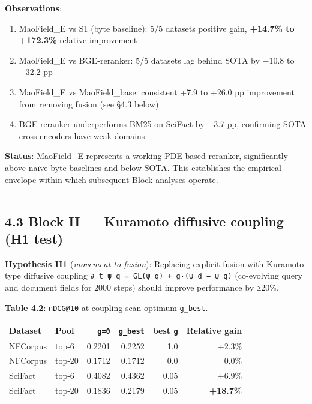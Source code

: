 \documentclass[
]{article}
\providecommand{\tightlist}{%
  \setlength{\itemsep}{0pt}\setlength{\parskip}{0pt}}
\begin{document}
\textbf{Observations}:

\begin{enumerate}
\def\labelenumi{\arabic{enumi}.}
\tightlist
\item
  MaoField\_E vs S1 (byte baseline): 5/5 datasets positive gain,
  \textbf{+14.7\% to +172.3\%} relative improvement
\item
  MaoField\_E vs BGE-reranker: 5/5 datasets lag behind SOTA by −10.8 to
  −32.2 pp
\item
  MaoField\_E vs MaoField\_base: consistent +7.9 to +26.0 pp improvement
  from removing fusion (see §4.3 below)
\item
  BGE-reranker underperforms BM25 on SciFact by −3.7 pp, confirming SOTA
  cross-encoders have weak domains
\end{enumerate}

\textbf{Status}: MaoField\_E represents a working PDE-based reranker,
significantly above naïve byte baselines and below SOTA. This
establishes the empirical envelope within which subsequent Block
analyses operate.

\begin{center}\rule{0.5\linewidth}{0.5pt}\end{center}

\hypertarget{block-ii-kuramoto-diffusive-coupling-h1-test}{%
\subsection{4.3 Block II --- Kuramoto diffusive coupling (H1
test)}\label{block-ii-kuramoto-diffusive-coupling-h1-test}}

\textbf{Hypothesis H1} (\emph{movement to fusion}): Replacing explicit
fusion with Kuramoto-type diffusive coupling
\texttt{∂\_t\ ψ\_q\ =\ GL(ψ\_q)\ +\ g·(ψ\_d\ −\ ψ\_q)} (co-evolving
query and document fields for 2000 steps) should improve performance by
≥20\%.

\textbf{Table 4.2}: \texttt{nDCG@10} at coupling-scan optimum
\texttt{g\_best}.

\begin{longtable}[]{@{}llrrrr@{}}
\toprule\noalign{}
Dataset & Pool & \texttt{g=0} & \texttt{g\_best} & best \texttt{g} &
Relative gain \\
\midrule\noalign{}
\endhead
\bottomrule\noalign{}
\endlastfoot
NFCorpus & top-6 & 0.2201 & 0.2252 & 1.0 & +2.3\% \\
NFCorpus & top-20 & 0.1712 & 0.1712 & 0.0 & 0.0\% \\
SciFact & top-6 & 0.4082 & 0.4362 & 0.05 & +6.9\% \\
SciFact & top-20 & 0.1836 & 0.2179 & 0.05 & \textbf{+18.7\%} \\
\end{longtable}
\end{document}
